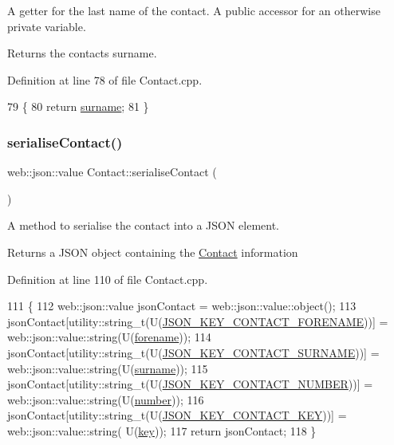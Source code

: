 A getter for the last name of the contact. A public accessor for an otherwise private variable.

\begin{DoxyReturn}{Returns}
the contact\textquotesingle{}s surname. 
\end{DoxyReturn}


Definition at line 78 of file Contact.\+cpp.


\begin{DoxyCode}
79 \{
80     \textcolor{keywordflow}{return} \hyperlink{class_contact_a22518b332de3bd09ed94eb4d9de54894}{surname};
81 \}
\end{DoxyCode}
\mbox{\label{class_contact_ae52f56140bbde46dd30cb90dd6cfba4f}} 
\subsubsection{\texorpdfstring{serialise\+Contact()}{serialiseContact()}}
{\footnotesize\ttfamily web\+::json\+::value Contact\+::serialise\+Contact (\begin{DoxyParamCaption}{ }\end{DoxyParamCaption})}

A method to serialise the contact into a J\+S\+ON element.

\begin{DoxyReturn}{Returns}
a J\+S\+ON object containing the \hyperlink{class_contact}{Contact} information 
\end{DoxyReturn}


Definition at line 110 of file Contact.\+cpp.


\begin{DoxyCode}
111 \{
112     web::json::value jsonContact = web::json::value::object();
113     jsonContact[utility::string\_t(U(\hyperlink{_contact_8h_a18b1ad44af79fea17bfed22ff66f94f8}{JSON\_KEY\_CONTACT\_FORENAME}))] = 
      web::json::value::string(U(\hyperlink{class_contact_af64e25f3271abad7970293e6adfdf457}{forename}));
114     jsonContact[utility::string\_t(U(\hyperlink{_contact_8h_a579318fe639c3cf3628817c4090be13e}{JSON\_KEY\_CONTACT\_SURNAME}))] = 
      web::json::value::string(U(\hyperlink{class_contact_a22518b332de3bd09ed94eb4d9de54894}{surname}));
115     jsonContact[utility::string\_t(U(\hyperlink{_contact_8h_a97dc3d327e5283642c81bc7d6a572ced}{JSON\_KEY\_CONTACT\_NUMBER}))] = 
      web::json::value::string(U(\hyperlink{class_contact_abd24eed27b661da4ab20553443212437}{number}));
116     jsonContact[utility::string\_t(U(\hyperlink{_contact_8h_a90f2095b835454d47c72995503684937}{JSON\_KEY\_CONTACT\_KEY}))] = web::json::value::string(
      U(\hyperlink{class_contact_a5bc7925e6356e29c9cbad7266f0a4340}{key}));
117     \textcolor{keywordflow}{return} jsonContact;
118 \}
\end{DoxyCode}


